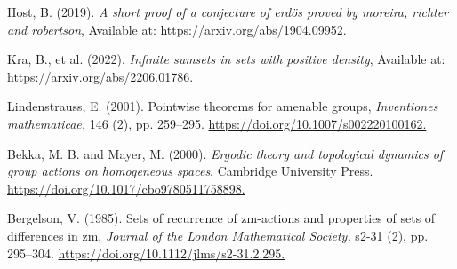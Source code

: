 \documentclass[
  british,
]{article}
\newlength{\cslhangindent}
\newenvironment{CSLReferences}[2] %
 {\begin{list}{}{%
  \setlength{\itemindent}{0pt}
  \setlength{\leftmargin}{0pt}
  \setlength{\parsep}{0pt}
  \ifodd #1
   \setlength{\leftmargin}{\cslhangindent}
   \setlength{\itemindent}{-1\cslhangindent}
  \fi
  \setlength{\itemsep}{#2\baselineskip}}}
 {\end{list}}
\theoremstyle{definition}
\theoremstyle{plain}
\theoremstyle{plain}
\theoremstyle{remark}
\begin{document}
\label{refs}
\begin{CSLReferences}{1}{0}
Host, B. (2019). \textquotesingle{}\emph{A short proof of a conjecture
of erdös proved by moreira, richter and robertson}\textquotesingle,
Available at: \url{https://arxiv.org/abs/1904.09952}.

Kra, B., et al. (2022). \textquotesingle{}\emph{Infinite sumsets in sets
with positive density}\textquotesingle, Available at:
\url{https://arxiv.org/abs/2206.01786}.

Lindenstrauss, E. (2001). \textquotesingle Pointwise theorems for
amenable groups\textquotesingle, \emph{\emph{Inventiones mathematicae},}
146 (2), pp. 259--295.
\href{https://doi.org/10.1007/s002220100162}{https://doi.org/10.1007/s002220100162.}

Bekka, M. B. and Mayer, M. (2000). \emph{Ergodic theory and topological
dynamics of group actions on homogeneous spaces}. Cambridge University
Press.
\href{https://doi.org/10.1017/cbo9780511758898}{https://doi.org/10.1017/cbo9780511758898.}

Bergelson, V. (1985). \textquotesingle Sets of recurrence of zm-actions
and properties of sets of differences in zm\textquotesingle,
\emph{\emph{Journal of the London Mathematical Society},} s2-31 (2), pp.
295--304.
\href{https://doi.org/10.1112/jlms/s2-31.2.295}{https://doi.org/10.1112/jlms/s2-31.2.295.}

\end{CSLReferences}
\end{document}
